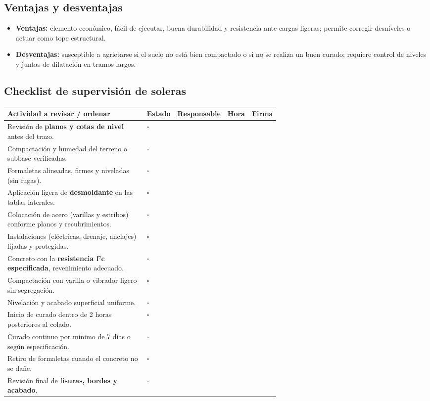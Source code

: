 \documentclass[12pt]{article}
\newcommand{\cbox}{\(\square\)}       %
\begin{document}
	\subsection{Ventajas y desventajas}
	\begin{itemize}
		\item \textbf{Ventajas:} elemento económico, fácil de ejecutar, buena durabilidad y resistencia ante cargas ligeras; permite corregir desniveles o actuar como tope estructural.
		\item \textbf{Desventajas:} susceptible a agrietarse si el suelo no está bien compactado o si no se realiza un buen curado; requiere control de niveles y juntas de dilatación en tramos largos.
	\end{itemize}
	
	\subsection{Checklist de supervisión de soleras}
	
	\begin{tabularx}{\linewidth}{>{\raggedright\arraybackslash}p{0.64\linewidth} >{\centering\arraybackslash}m{1.5cm} >{\raggedright\arraybackslash}p{2.6cm} >{\centering\arraybackslash}m{2cm} >{\centering\arraybackslash}m{2.2cm}}
		\toprule
		\textbf{Actividad a revisar / ordenar} & \textbf{Estado} & \textbf{Responsable} & \textbf{Hora} & \textbf{Firma}\\
		\midrule
		Revisión de \textbf{planos y cotas de nivel} antes del trazo. & \cbox & & & \\
		Compactación y humedad del terreno o subbase verificadas. & \cbox & & & \\
		Formaletas alineadas, firmes y niveladas (sin fugas). & \cbox & & & \\
		Aplicación ligera de \textbf{desmoldante} en las tablas laterales. & \cbox & & & \\
		Colocación de acero (varillas y estribos) conforme planos y recubrimientos. & \cbox & & & \\
		Instalaciones (eléctricas, drenaje, anclajes) fijadas y protegidas. & \cbox & & & \\
		Concreto con la \textbf{resistencia f’c especificada}, revenimiento adecuado. & \cbox & & & \\
		Compactación con varilla o vibrador ligero sin segregación. & \cbox & & & \\
		Nivelación y acabado superficial uniforme. & \cbox & & & \\
		Inicio de curado dentro de 2 horas posteriores al colado. & \cbox & & & \\
		Curado continuo por mínimo de 7 días o según especificación. & \cbox & & & \\
		Retiro de formaletas cuando el concreto no se dañe. & \cbox & & & \\
		Revisión final de \textbf{fisuras, bordes y acabado}. & \cbox & & & \\
		\bottomrule
	\end{tabularx}
	
\end{document}
